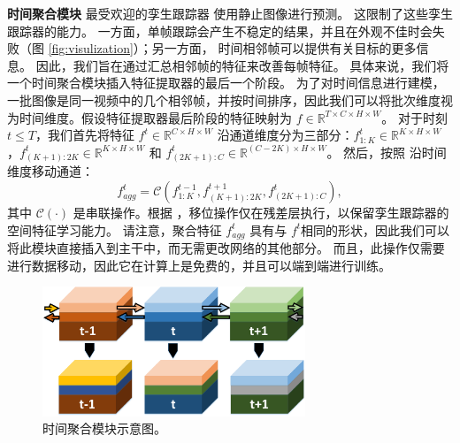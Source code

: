 \textbf{时间聚合模块}
最受欢迎的孪生跟踪器 \cite{SiamRPN++, Wang2018SiamMask} 使用静止图像进行预测。%
这限制了这些孪生跟踪器的能力。
一方面，单帧跟踪会产生不稳定的结果，并且在外观不佳时会失败（图 \ref{fig:visulization}）；另一方面，
时间相邻帧可以提供有关目标的更多信息。
因此，我们旨在通过汇总相邻帧的特征来改善每帧特征。
具体来说，我们将一个时间聚合模块插入特征提取器的最后一个阶段。
为了对时间信息进行建模，一批图像是同一视频中的几个相邻帧，并按时间排序，因此我们可以将批次维度视为时间维度。假设特征提取器最后阶段的特征映射为 $f \in \mathbb R ^ {T \times C \times H \times W}$。
对于时刻 $t \leq T$，我们首先将特征 $f^t \in \mathbb R ^ {C \times H \times W}$ 沿通道维度分为三部分：$f_{1:K}^t \in \mathbb R ^ {K \times H \times W}$，$f_{(K+1):2K}^t \in \mathbb R ^ {K \times H \times W}$ 和 $f_{(2K+1):C}^t \in \mathbb R ^ {(C-2K) \times H \times W}$。
然后，按照 \cite{lin2019tsm} 沿时间维度移动通道：
\begin{equation}
    f_{agg}^t = \mathcal{C}(f_{{1:K}}^{t-1}, f_{(K+1):2K}^{t+1}, f_{(2K+1):C}^{t}),
\end{equation}
其中 $\mathcal{C}(\cdot)$ 是串联操作。根据 \cite{lin2019tsm}，移位操作仅在残差层执行，以保留孪生跟踪器的空间特征学习能力。
请注意，聚合特征 $f_{agg}^t$ 具有与 $f^t$相同的形状，因此我们可以将此模块直接插入到主干中，而无需更改网络的其他部分。
而且，此操作仅需要进行数据移动，因此它在计算上是免费的，并且可以端到端进行训练。

\begin{figure}[t]
    \centering
    \includegraphics[width=0.7\textwidth]{Img/end/TSM_v1.pdf}
    \caption{时间聚合模块示意图。}
    \label{fig:TSM}
\end{figure}

